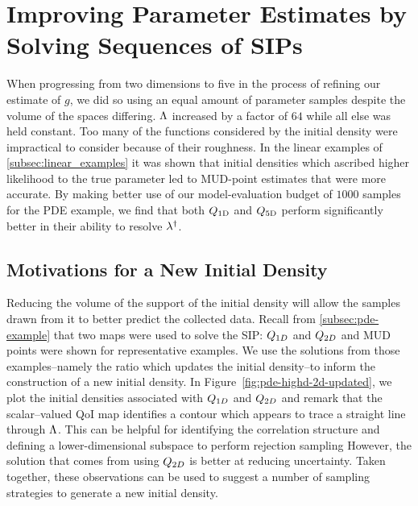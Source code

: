 \section{Improving Parameter Estimates by Solving Sequences of SIPs}\label{sec:mud-pde-sequence}
When progressing from two dimensions to five in the process of refining our estimate of $g$, we did so using an equal amount of parameter samples despite the volume of the spaces differing.
${\Lambda}$ increased by a factor of $64$ while all else was held constant.
Too many of the functions considered by the initial density were impractical to consider because of their roughness.
In the linear examples of \ref{subsec:linear_examples} it was shown that initial densities which ascribed higher likelihood to the true parameter led to MUD-point estimates that were more accurate.
By making better use of our model-evaluation budget of $1000$ samples for the PDE example, we find that both $Q_\text{1D}$ and $Q_\text{5D}$ perform significantly better in their ability to resolve $\lambda^\dagger$.


\subsection{Motivations for a New Initial Density}
Reducing the volume of the support of the initial density will allow the samples drawn from it to better predict the collected data.
Recall from \ref{subsec:pde-example} that two maps were used to solve the SIP: $Q_{1D}$ and $Q_{2D}$ and MUD points were shown for representative examples.
We use the solutions from those examples\---namely the ratio which updates the initial density\---to inform the construction of a new initial density.
In Figure~\ref{fig:pde-highd-2d-updated}, we plot the initial densities associated with $Q_{1D}$ and $Q_{2D}$ and remark that the scalar--valued QoI map identifies a contour which appears to trace a straight line through ${\Lambda}$.
This can be helpful for identifying the correlation structure and defining a lower-dimensional subspace to perform rejection sampling However, the solution that comes from using $Q_{2D}$ is better at reducing uncertainty.
Taken together, these observations can be used to suggest a number of sampling strategies to generate a new initial density.

